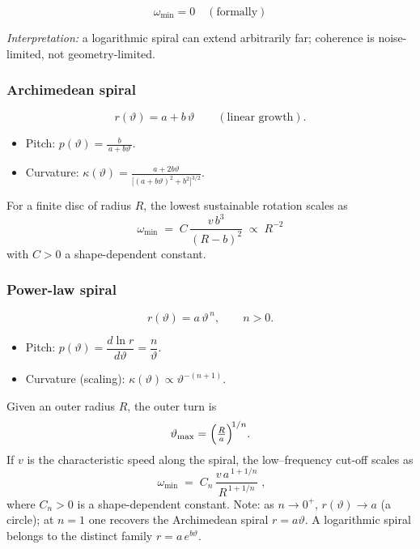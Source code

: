 \begin{equation}
  \boxed{\;\omega_{\min}=0 \quad (\text{formally})\;}
\end{equation}

\emph{Interpretation:} a logarithmic spiral can extend arbitrarily far; coherence is
noise-limited, not geometry-limited.

\subsubsection*{Archimedean spiral}

\begin{equation}
  r(\vartheta) = a + b\,\vartheta \qquad (\text{linear growth}).
\end{equation}

\begin{itemize}[leftmargin=1.5em]
  \item Pitch: \(\displaystyle p(\vartheta)=\frac{b}{\,a+b\vartheta\,}.\)
  \item Curvature: \(\displaystyle
    \kappa(\vartheta)
    = \frac{a + 2b\vartheta}
           {\bigl[(a+b\vartheta)^{2}+b^{2}\bigr]^{3/2}}.\)
\end{itemize}

For a finite disc of radius \(R\), the lowest sustainable rotation scales as
\begin{equation}
  \boxed{\;
    \omega_{\min}
    \;=\; C\,\frac{v\,b^{3}}{(R - b)^{2}}
    \;\propto\; R^{-2}
  \;}
\end{equation}
with \(C>0\) a shape-dependent constant.


\subsubsection*{Power-law spiral}

\begin{equation}
  r(\vartheta) = a\,\vartheta^{\,n}, \qquad n>0.
\end{equation}

\begin{itemize}[leftmargin=1.5em]
  \item Pitch: \(p(\vartheta)=\dfrac{d\ln r}{d\vartheta}=\dfrac{n}{\vartheta}\).
  \item Curvature (scaling): \(\kappa(\vartheta)\propto \vartheta^{-(n+1)}\).
\end{itemize}

Given an outer radius \(R\), the outer turn is
\begin{equation}
  \vartheta_{\max}=\Bigl(\tfrac{R}{a}\Bigr)^{\!1/n}.
\end{equation}
If \(v\) is the characteristic speed along the spiral, the low–frequency cut-off scales as
\begin{equation}
  \boxed{\;
    \omega_{\min}
    \;=\; C_{n}\,\frac{v\,a^{\,1+1/n}}{R^{\,1+1/n}}
    \;},
\end{equation}
where \(C_n>0\) is a shape-dependent constant. Note: as \(n\to 0^{+}\), \(r(\vartheta)\to a\) (a circle); at \(n=1\) one recovers the Archimedean spiral \(r=a\vartheta\). A logarithmic spiral belongs to the distinct family \(r=a\,e^{b\vartheta}\).


